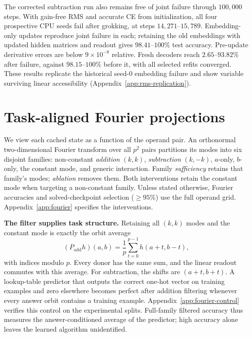 \documentclass{article}
\begin{document}
The corrected subtraction run also remains free of joint failure through $100{,}000$ steps. With gain-free RMS and accurate CE from initialization, all four prospective CPU seeds fail after grokking, at steps $14{,}271$--$15{,}789$. Embedding-only updates reproduce joint failure in each; retaining the old embeddings with updated hidden matrices and readout gives $98.41$--$100\%$ test accuracy. Pre-update derivative errors are below $9\times10^{-8}$ relative. Fresh decoders reach $2.65$--$93.82\%$ after failure, against $98.15$--$100\%$ before it, with all selected refits converged. These results replicate the historical seed-$0$ embedding failure and show variable surviving linear accessibility (Appendix~\ref{app:rms-replication}).

\section{Task-aligned Fourier projections}
\label{sec:family}

We view each cached state as a function of the operand pair. An orthonormal two-dimensional Fourier transform over all $p^2$ pairs partitions its modes into six disjoint families: non-constant \emph{addition} $(k,k)$, \emph{subtraction} $(k,-k)$, $a$-only, $b$-only, the constant mode, and generic interaction. Family \emph{sufficiency} retains that family's modes; \emph{ablation} removes them. Both interventions retain the constant mode when targeting a non-constant family. Unless stated otherwise, Fourier accuracies and solved-checkpoint selection ($\geq95\%$) use the full operand grid. Appendix~\ref{app:fourier} specifies the interventions.

\textbf{The filter supplies task structure.} Retaining all $(k,k)$ modes and the constant mode is exactly the orbit average
\begin{equation}
(P_{\mathrm{add}}h)(a,b)=\frac{1}{p}\sum_{t=0}^{p-1}h(a+t,b-t),
\label{eq:orbit-average}
\end{equation}
with indices modulo $p$. Every donor has the same sum, and the linear readout commutes with this average. For subtraction, the shifts are $(a+t,b+t)$. A lookup-table predictor that outputs the correct one-hot vector on training examples and zero elsewhere becomes perfect after addition filtering whenever every answer orbit contains a training example. Appendix~\ref{app:fourier-control} verifies this control on the experimental splits. Full-family filtered accuracy thus measures the answer-conditioned average of the predictor; high accuracy alone leaves the learned algorithm unidentified.
\end{document}
